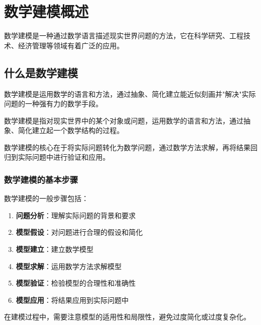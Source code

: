 
\chapter{数学建模概述}\label{chap:intro}

数学建模是一种通过数学语言描述现实世界问题的方法，它在科学研究、工程技术、经济管理等领域有着广泛的应用。

\section{什么是数学建模}\label{sec:what-is-modeling}

数学建模是运用数学的语言和方法，通过抽象、简化建立能近似刻画并"解决"实际问题的一种强有力的数学手段。

\begin{definition}[数学建模]\label{def:mathematical-modeling}
数学建模是指对现实世界中的某个对象或问题，运用数学的语言和方法，通过抽象、简化建立起一个数学结构的过程。
\end{definition}

\begin{infobox}[title=重要概念]
数学建模的核心在于将实际问题转化为数学问题，通过数学方法求解，再将结果回归到实际问题中进行验证和应用。
\end{infobox}

\subsection{数学建模的基本步骤}

数学建模的一般步骤包括：

\begin{enumerate}
    \item \textbf{问题分析}：理解实际问题的背景和要求
    \item \textbf{模型假设}：对问题进行合理的假设和简化
    \item \textbf{模型建立}：建立数学模型
    \item \textbf{模型求解}：运用数学方法求解模型
    \item \textbf{模型验证}：检验模型的合理性和准确性
    \item \textbf{模型应用}：将结果应用到实际问题中
\end{enumerate}

\begin{warningbox}[title=注意事项]
在建模过程中，需要注意模型的适用性和局限性，避免过度简化或过度复杂化。
\end{warningbox}

